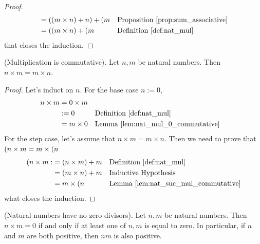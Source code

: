 \begin{subsequence}
\begin{proof}
\begin{align*}
            &= ((m \times n) + n) + (m\next) && \text{Proposition~\ref{prop:sum_associative}}\\
            &= ((m\next) \times n) + (m\next) && \text{Definition~\ref{def:nat_mul}}
        \end{align*}
        that closes the induction.
    \end{proof}
    \begin{lemma}
        \textup{(Multiplication is commutative)}. Let $n, m$ be natural numbers. Then $n\times m = m \times n$.\label{lem:nat_mul_commutative}
    \end{lemma}
    \begin{proof}
        Let's induct on $n$. For the base case $n:=0$, 
        \begin{align*}
            n\times m &= 0 \times m\\
            & := 0 &&\text{Definition~\ref{def:nat_mul}}\\
            &= m \times 0&&\text{Lemma~\ref{lem:nat_mul_0_commutative}}
        \end{align*}
        For the step case, let's assume that $n\times m = m \times n$. Then we need to prove that $(n\next) \times m = m \times (n\next)$
        \begin{align*}
           (n\next) \times m :&= (n\times m) + m &&\text{Definition~\ref{def:nat_mul}}\\
           &= (m\times n) + m && \text{Inductive Hypothesis}\\
           &= m \times (n\next) && \text{Lemma~\ref{lem:nat_suc_mul_commutative}}
        \end{align*}
        what closes the induction.
    \end{proof}
\end{subsequence}
\begin{lemma}
    \textup{(Natural numbers have no zero divisors)}. Let $n, m$ be natural numbers. Then $n \times m = 0$ if and only if at least one of $n, m$ is equal to zero. In particular, if $n$ and $m$ are both positive, then $nm$ is also positive.
\end{lemma}
